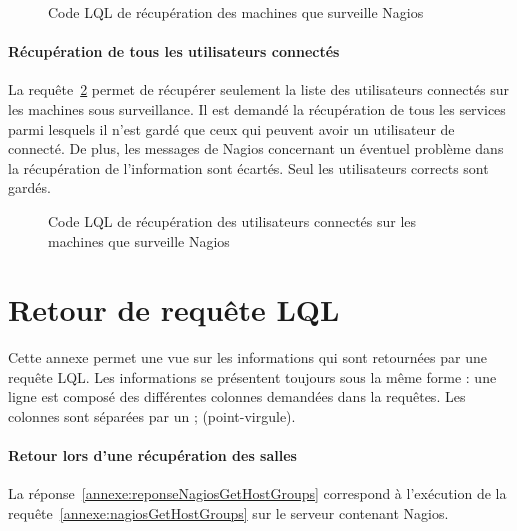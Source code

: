 \begin{appendices}
\begin{figure}[!ht]
	
	\caption{Code LQL de r\'ecup\'eration des machines que surveille Nagios}
	\label{annexe:nagiosGetResources}

\end{figure}

\subsubsection{R\'ecup\'eration de tous les utilisateurs connect\'es}

La requ\^ete~\ref{annexe:nagiosGetUsersLogged} permet de r\'ecup\'erer seulement la liste des utilisateurs connect\'es sur les machines sous surveillance.
Il est demand\'e la r\'ecup\'eration de tous les services parmi lesquels il n'est gard\'e que ceux qui peuvent avoir un utilisateur de connect\'e.
De plus, les messages de Nagios concernant un \'eventuel probl\`eme dans la r\'ecup\'eration de l'information sont \'ecart\'es.
Seul les utilisateurs \og corrects\fg{} sont gard\'es.

\vspace{0.20cm}

\begin{figure}[!ht]
	
	\caption{Code LQL de r\'ecup\'eration des utilisateurs connect\'es sur les machines que surveille Nagios}
	\label{annexe:nagiosGetUsersLogged}

\end{figure}

\chapter{Retour de requ\^ete LQL}
\label{chapterAnnexe:reponseLQLNagios}

Cette annexe permet une vue sur les informations qui sont retourn\'ees par une requ\^ete LQL.
Les informations se pr\'esentent toujours sous la m\^eme forme : une ligne est compos\'e des diff\'erentes colonnes demand\'ees dans la requ\^etes.
Les colonnes sont s\'epar\'ees par un \textsf{; (point-virgule)}.

\subsubsection{Retour lors d'une r\'ecup\'eration des salles}

La r\'eponse~\ref{annexe:reponseNagiosGetHostGroups} correspond \`a l'ex\'ecution de la requ\^ete~\ref{annexe:nagiosGetHostGroups} sur le serveur contenant Nagios.


\end{appendices}
